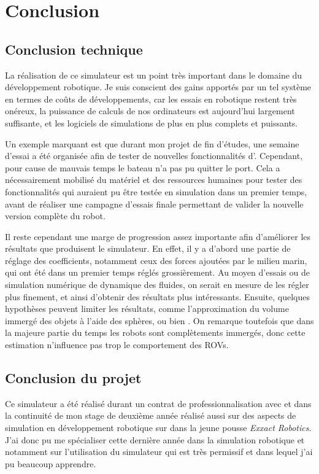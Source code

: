 \chapter{Conclusion}
\label{chapitre:conclusion}
	
	\section{Conclusion technique}

		La réalisation de ce simulateur est un point très important dans le domaine du développement robotique. Je suis conscient des gains apportés par un tel système en termes de coûts de développements, car les essais en robotique restent très onéreux, la puissance de calculs de nos ordinateurs est aujourd'hui largement suffisante, et les logiciels de simulations de plus en plus complets et puissants. 
		
		Un exemple marquant est que durant mon projet de fin d'études, une semaine d'essai a été organisée afin de tester de nouvelles fonctionnalités d'\argos{}. Cependant, pour cause de mauvais temps le bateau n'a pas pu quitter le port. Cela a nécessairement mobilisé du matériel et des ressources humaines pour tester des fonctionnalités qui auraient pu être testée en simulation dans un premier temps, avant de réaliser une campagne d'essais finale permettant de valider la nouvelle version complète du robot.

		Il reste cependant une marge de progression assez importante afin d'améliorer les résultats que produisent le simulateur. En effet, il y a d'abord une partie de réglage des coefficients, notamment ceux des forces ajoutées par le milieu marin, qui ont été dans un premier temps réglés grossièrement. Au moyen d'essais ou de simulation numérique de dynamique des fluides, on serait en mesure de les régler plus finement, et ainsi d'obtenir des résultats plus intéressants. Ensuite, quelques hypothèses peuvent limiter les résultats, comme l'approximation du volume immergé des objets à l'aide des sphères, ou bien . On remarque toutefois que dans la majeure partie du temps les robots sont complètements immergés, donc cette estimation n'influence pas trop le comportement des \gls{ROV}s. 
	
	\section{Conclusion du projet}

		Ce simulateur a été réalisé durant un contrat de professionnalisation avec \forssea{} et dans la continuité de mon stage de deuxième année réalisé aussi sur des aspects de simulation en développement robotique sur \gazebo{} dans la jeune pousse \textit{Exxact Robotics}. J'ai donc pu me spécialiser cette dernière année dans la simulation robotique et notamment sur l'utilisation du simulateur \gazebo{} qui est très permissif et dans lequel j'ai pu beaucoup apprendre.

